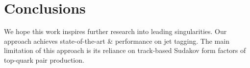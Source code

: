 \section{Conclusions}\label{sec:conclusions}

We hope this work inspires further research into leading singularities.
Our approach achieves state-of-the-art & performance on jet tagging. The
main limitation of this approach is its reliance on track-based Sudakov
form factors of top-quark pair production.

